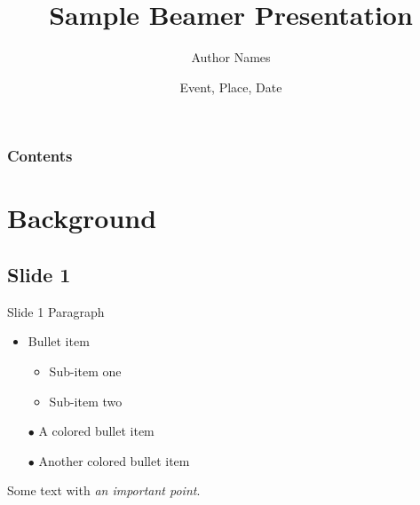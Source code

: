 \documentclass[compress,ignorenonframetext]{beamer}
\title{Sample Beamer Presentation}
\author{Author Names}
\institute{Company or Institute}
\date{Event, Place, Date}
\begin{document}

\begin{frame}[plain]
\titlepage %
\addtocounter{framenumber}{-1}
\end{frame}

\begin{frame}
\frametitle{Contents}%
\tableofcontents%
\end{frame}

\section{Background}

\subsection{Slide 1}
\begin{frame}{Slide 1}
Paragraph
\begin{itemize}
\item Bullet item
	\begin{itemize}
	\item Sub-item one
	\item Sub-item two
	\end{itemize}
\item[\color{green} $\bullet$] A colored bullet item
\item[\color{red} $\bullet$] Another colored bullet item
\end{itemize}

Some text with {\em an important point}.

\end{frame}
\end{document}
